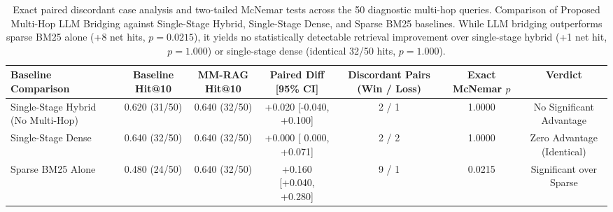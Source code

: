 \begin{table}[htbp]
\centering
\small
\caption{Exact paired discordant case analysis and two-tailed McNemar tests across the 50 diagnostic multi-hop queries. Comparison of Proposed Multi-Hop LLM Bridging against Single-Stage Hybrid, Single-Stage Dense, and Sparse BM25 baselines. While LLM bridging outperforms sparse BM25 alone (+8 net hits, $p = 0.0215$), it yields no statistically detectable retrieval improvement over single-stage hybrid (+1 net hit, $p = 1.000$) or single-stage dense (identical 32/50 hits, $p = 1.000$).}
\label{tab:multihop_paired_v3}
\begin{tabular}{lcccccc}
\toprule
Baseline Comparison & Baseline Hit@10 & MM-RAG Hit@10 & Paired Diff [95\% CI] & Discordant Pairs (Win / Loss) & Exact McNemar $p$ & Verdict \\
\midrule
Single-Stage Hybrid (No Multi-Hop) & 0.620 (31/50) & 0.640 (32/50) & +0.020 [-0.040, +0.100] & 2 / 1 & 1.0000 & No Significant Advantage \\
Single-Stage Dense                 & 0.640 (32/50) & 0.640 (32/50) & +0.000 [ 0.000, +0.071] & 2 / 2 & 1.0000 & Zero Advantage (Identical) \\
Sparse BM25 Alone                  & 0.480 (24/50) & 0.640 (32/50) & +0.160 [+0.040, +0.280] & 9 / 1 & 0.0215 & Significant over Sparse \\
\bottomrule
\end{tabular}
\end{table}
